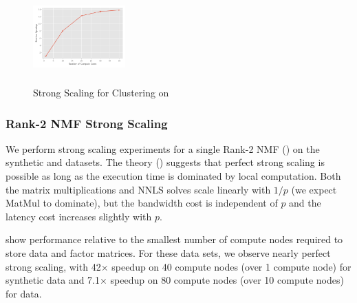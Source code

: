 \begin{figure}
\begin{center}
\includegraphics[height=1.4in, width=1.4in]{plots/dc_hierarchical_speedup.pdf}
\caption{Strong Scaling for Clustering on \hyper{}}
\label{fig:dcspeedup}
\end{center}
\end{figure}


\subsubsection{Rank-2 NMF Strong Scaling}

We perform strong scaling experiments for a single Rank-2 NMF () on the synthetic and \image{} datasets.
The theory () suggests that perfect strong scaling is possible as long as the execution time is dominated by local computation.
Both the matrix multiplications and NNLS solves scale linearly with $1/p$ (we expect MatMul to dominate), but the bandwidth cost is independent of $p$ and the latency cost increases slightly with $p$.

 show performance relative to the smallest number of compute nodes required to store data and factor matrices.
For these data sets, we observe nearly perfect strong scaling, with 42$\times$ speedup on 40 compute nodes (over 1 compute node) for synthetic data and 7.1$\times$ speedup on 80 compute nodes (over 10 compute nodes) for \image{} data.

